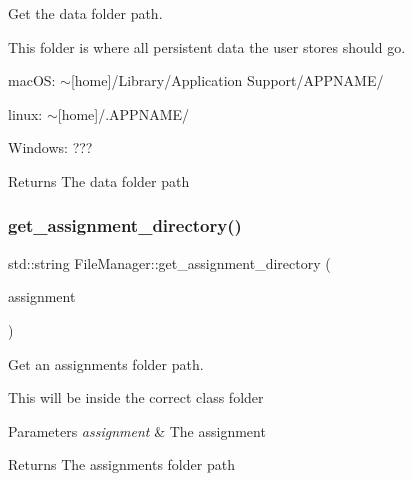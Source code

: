 Get the data folder path. 

This folder is where all persistent data the user stores should go.


\begin{DoxyItemize}
\item mac\+OS\+: $\sim$\mbox{[}home\mbox{]}/\+Library/\+Application Support/\+A\+P\+P\+N\+A\+M\+E/
\item linux\+: $\sim$\mbox{[}home\mbox{]}/.A\+P\+P\+N\+A\+M\+E/
\item Windows\+: ???
\end{DoxyItemize}

\begin{DoxyReturn}{Returns}
The data folder path 
\end{DoxyReturn}
\mbox{\label{class_file_manager_afd38efbb14e09f40b28b9f6b8a0b6c65}} 
\subsubsection{\texorpdfstring{get\+\_\+assignment\+\_\+directory()}{get\_assignment\_directory()}}
{\footnotesize\ttfamily std\+::string File\+Manager\+::get\+\_\+assignment\+\_\+directory (\begin{DoxyParamCaption}\item[{\hyperlink{class_g_a_assignment}{G\+A\+Assignment} $\ast$}]{assignment }\end{DoxyParamCaption})\hspace{0.3cm}{\ttfamily [static]}}



Get an assignment\textquotesingle{}s folder path. 

This will be inside the correct class folder


\begin{DoxyParams}{Parameters}
{\em assignment} & The assignment \\
\hline
\end{DoxyParams}
\begin{DoxyReturn}{Returns}
The assignment\textquotesingle{}s folder path 
\end{DoxyReturn}
\mbox{\label{class_file_manager_a1c8a15a04720ede4792d3ad1b3ed2b07}} 
